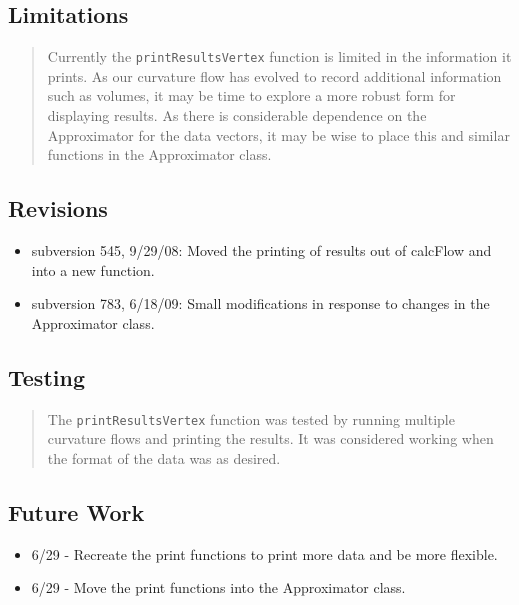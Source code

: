 \documentclass[10pt]{article}%
\begin{document}
\subsection*{Limitations}

\begin{quotation} Currently the \texttt{printResultsVertex} function is limited in the information it prints. As our curvature flow has evolved to record additional information such as volumes, it may be time to explore a more robust form for displaying results. As there is considerable dependence on the Approximator for the data vectors, it may be wise to place this and similar functions in the Approximator class.\end{quotation}

\subsection*{Revisions}

\begin{itemize}\item  subversion 545, 9/29/08: Moved the printing of results out of calcFlow and into a new function.
\item  subversion 783, 6/18/09: Small modifications in response to changes in the Approximator class.
\end{itemize}

\subsection*{Testing}

\begin{quotation} The \texttt{printResultsVertex} function was tested by running multiple curvature flows and printing the results. It was considered working when the format of the data was as desired.\end{quotation}

\subsection*{Future Work}

\begin{itemize}\item  6/29 - Recreate the print functions to print more data and be more flexible.
\item  6/29 - Move the print functions into the Approximator class.
\end{itemize}
    

%
\end{document}
